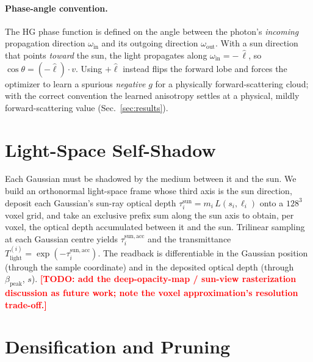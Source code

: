 \documentclass[sigconf]{acmart}
\newcommand{\bpeak}{\beta_{\mathrm{peak}}}
\newcommand{\Tlight}{T_{\mathrm{light}}}
\newcommand{\todo}[1]{\textcolor{red}{\textbf{[TODO: #1]}}}
\begin{document}
\paragraph{Phase-angle convention.}
The HG phase function is defined on the angle between the photon's
\emph{incoming} propagation direction $\omega_{\text{in}}$ and its outgoing
direction $\omega_{\text{out}}$. With a sun direction that points
\emph{toward} the sun, the light propagates along $\omega_{\text{in}} =
-\,\hat{\ell}$, so $\cos\theta = (-\hat{\ell})\cdot v$. Using $+\hat{\ell}$
instead flips the forward lobe and forces the optimizer to learn a spurious
\emph{negative} $g$ for a physically forward-scattering cloud; with the correct
convention the learned anisotropy settles at a physical, mildly
forward-scattering value (Sec.~\ref{sec:results}).

\section{Light-Space Self-Shadow}
\label{sec:shadow}

Each Gaussian must be shadowed by the medium between it and the sun. We build an
orthonormal light-space frame whose third axis is the sun direction, deposit
each Gaussian's sun-ray optical depth $\tau^{\mathrm{sun}}_i = m_i\,L(s_i,
\ell_i)$ onto a $128^3$ voxel grid, and take an exclusive prefix sum along the
sun axis to obtain, per voxel, the optical depth accumulated between it and the
sun. Trilinear sampling at each Gaussian centre yields $\tau^{\mathrm{sun,acc}}_i$
and the transmittance $\Tlight^{(i)} = \exp(-\tau^{\mathrm{sun,acc}}_i)$.
The readback is differentiable in the Gaussian position (through the sample
coordinate) and in the deposited optical depth (through $\bpeak$, $s$).
\todo{add the deep-opacity-map / sun-view rasterization discussion as future
work; note the voxel approximation's resolution trade-off.}

\section{Densification and Pruning}
\label{sec:densify}
\end{document}
